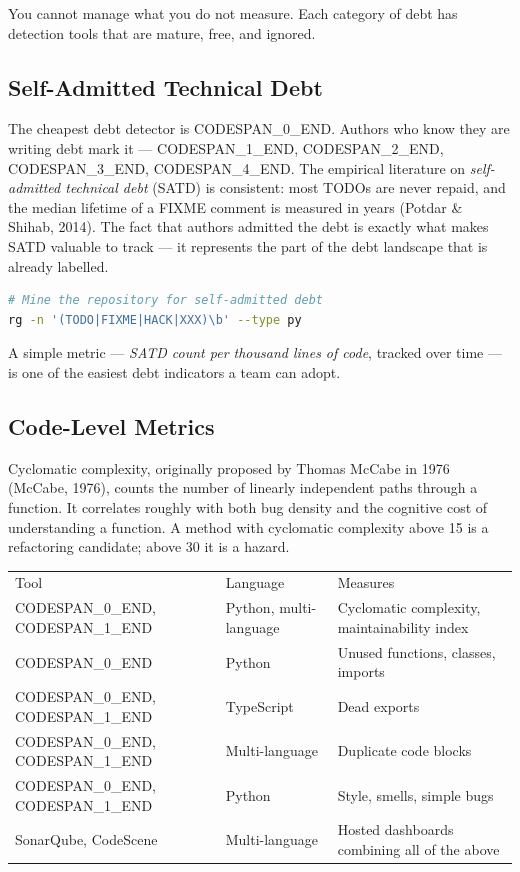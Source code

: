 \documentclass[11pt,a4paper]{book}
\begin{document}
You cannot manage what you do not measure. Each category of debt has detection tools that are mature, free, and ignored.

\subsection{Self-Admitted Technical Debt}

The cheapest debt detector is CODESPAN\_0\_END. Authors who know they are writing debt mark it --- CODESPAN\_1\_END, CODESPAN\_2\_END, CODESPAN\_3\_END, CODESPAN\_4\_END. The empirical literature on \textit{self-admitted technical debt} (SATD) is consistent: most TODOs are never repaid, and the median lifetime of a FIXME comment is measured in years (Potdar \& Shihab, 2014). The fact that authors admitted the debt is exactly what makes SATD valuable to track --- it represents the part of the debt landscape that is already labelled.

\begin{lstlisting}[language=Bash]
# Mine the repository for self-admitted debt
rg -n '(TODO|FIXME|HACK|XXX)\b' --type py
\end{lstlisting}

A simple metric --- \textit{SATD count per thousand lines of code}, tracked over time --- is one of the easiest debt indicators a team can adopt.

\subsection{Code-Level Metrics}

Cyclomatic complexity, originally proposed by Thomas McCabe in 1976 (McCabe, 1976), counts the number of linearly independent paths through a function. It correlates roughly with both bug density and the cognitive cost of understanding a function. A method with cyclomatic complexity above 15 is a refactoring candidate; above 30 it is a hazard.

\begin{tabular}{lll}
\hline
Tool & Language & Measures \\
CODESPAN\_0\_END, CODESPAN\_1\_END & Python, multi-language & Cyclomatic complexity, maintainability index \\
CODESPAN\_0\_END & Python & Unused functions, classes, imports \\
CODESPAN\_0\_END, CODESPAN\_1\_END & TypeScript & Dead exports \\
CODESPAN\_0\_END, CODESPAN\_1\_END & Multi-language & Duplicate code blocks \\
CODESPAN\_0\_END, CODESPAN\_1\_END & Python & Style, smells, simple bugs \\
SonarQube, CodeScene & Multi-language & Hosted dashboards combining all of the above \\
\hline
\end{tabular}
\end{document}
